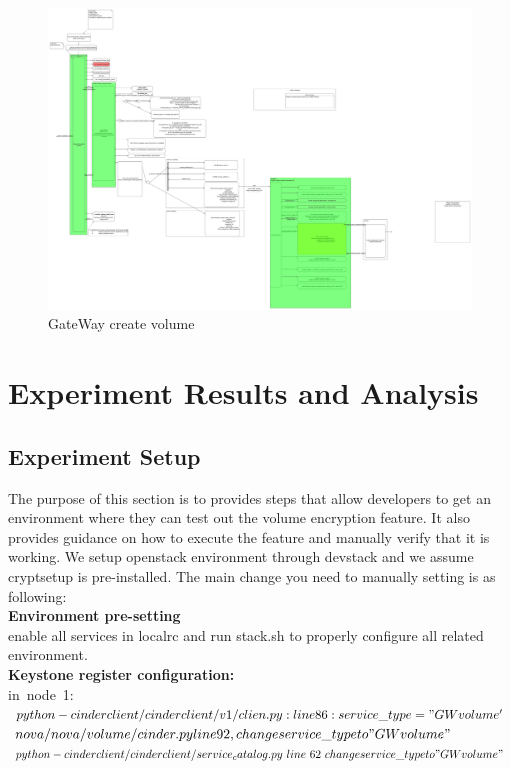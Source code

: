 \documentclass[10pt]{report}
\begin{document}
			\begin{figure}[fht]
				\includegraphics[width=\textwidth,height=\textheight,keepaspectratio] {GW-createvolume}
				\caption{GateWay create volume}
				\label{GWcreate}
			\end{figure}
			
			\section{Experiment Results and Analysis}
			\subsection{Experiment Setup}
			The purpose of this section is to provides steps that allow developers to get an environment where they can test out the volume encryption feature. It also provides guidance on how to execute the feature and manually verify that it is working.
			We setup openstack environment through devstack and we assume cryptsetup is pre-installed. The main change you need to manually setting is as following:\\
			\textbf{Environment pre-setting}\\
			enable all services in localrc and run stack.sh to properly configure all related environment.\\
			\textbf{Keystone register configuration:}\\
			
			in\ node\ 1:$python-cinderclient/cinderclient/v1/clien.py: line 86: service\_type = "GWvolume'$\\
			$nova/nova/volume/cinder.py line 92, change service\_type to "GWvolume"$\\
			$python-cinderclient/cinderclient/service_catalog.py\ line\ 62\ change service\_type to "GWvolume"$\\
			
\end{document}
